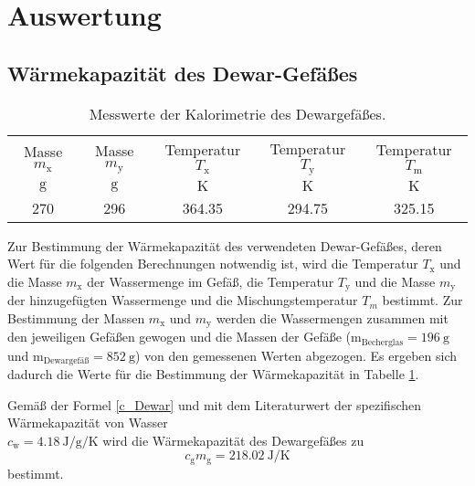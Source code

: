 \section{Auswertung}
\label{sec:Auswertung}
\subsection{Wärmekapazität des Dewar-Gefäßes}
\begin{table}[ht]
	\centering
	\begin{tabular}{ccccc}%
		\toprule
		{Masse $m_\text{x}$}& {Masse $m_\text{y}$}  &{Temperatur  $T_\text{x}$}&{Temperatur $T_\text{y}$}  &{Temperatur $T_\text{m}$}\\
		{$\si{\gram}$}& {$\si{\gram}$}  &{$\si{\kelvin}$}& {$\si{\kelvin}$}  &{$\si{\kelvin}$}\\
		\midrule
		270 & 296 & 364.35 & 294.75 & 325.15\\
		\bottomrule
	\end{tabular}
	\caption{Messwerte der Kalorimetrie des Dewargefäßes.}
	\label{tab:messung1}
\end{table}
Zur Bestimmung der Wärmekapazität des verwendeten Dewar-Gefäßes, deren Wert für die folgenden Berechnungen notwendig ist,
wird die Temperatur $T_\text{x}$ und die Masse $m_\text{x}$ der Wassermenge im Gefäß, die Temperatur $T_\text{y}$ und die Masse $m_\text{y}$ der hinzugefügten Wassermenge und die Mischungstemperatur $T_m$ bestimmt.
Zur Bestimmung der Massen $m_\text{x}$ und $m_\text{y}$ werden die Wassermengen zusammen mit den jeweiligen Gefäßen gewogen und die Massen der Gefäße 
	($\text{m}_\text{Becherglas}=\SI{196}{\gram}$ und 
	$\text{m}_\text{Dewargefäß}=\SI{852}{\gram}$)
von den gemessenen Werten abgezogen.
Es ergeben sich dadurch die Werte für die Bestimmung der Wärmekapazität in Tabelle \ref{tab:messung1}.

Gemäß der Formel \eqref{c_Dewar}
und mit dem Literaturwert\cite{NO} der spezifischen Wärmekapazität von Wasser \\
$c_\text{w}=\SI{4.18}{\joule\per\gram\per\kelvin}$ wird die Wärmekapazität des Dewargefäßes zu
\begin{equation}
	c_\mathup{g}m_\mathup{g}=\SI{218.02}{\joule\per\kelvin}
	\label{wert:waerme_dewar}
\end{equation}
bestimmt.

